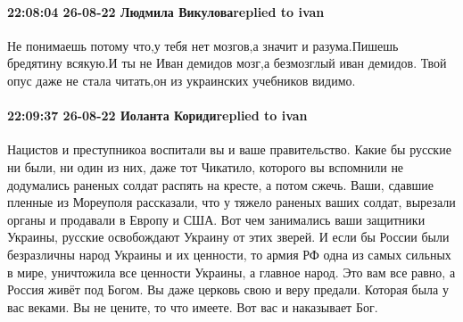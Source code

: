  
 
 
 
 

\paragraph{22:08:04 26-08-22 Людмила Викуловаreplied to ivan}

Не понимаешь потому что,у тебя нет мозгов,а значит и разума.Пишешь бредятину
всякую.И ты не Иван демидов мозг,а безмозглый иван демидов. Твой опус даже не
стала читать,он из украинских учебников видимо.

\paragraph{22:09:37 26-08-22 Иоланта Коридиreplied to ivan}

Нацистов и преступникоа воспитали вы и ваше правительство. Какие бы русские ни
были, ни один из них, даже тот Чикатило, которого вы вспомнили не додумались
раненых солдат распять на кресте, а потом сжечь. Ваши, сдавшие пленные из
Мореуполя рассказали, что у тяжело раненых ваших солдат, вырезали органы и
продавали в Европу и США. Вот чем занимались ваши защитники Украины, русские
освобождают Украину от этих зверей. И если бы России были безразличны народ
Украины и их ценности, то армия РФ одна из самых сильных в мире, уничтожила все
ценности Украины, а главное народ. Это вам все равно, а Россия живёт под Богом.
Вы даже церковь свою и веру предали. Которая была у вас веками. Вы не цените,
то что имеете. Вот вас и наказывает Бог. 🙏🙏🙏
